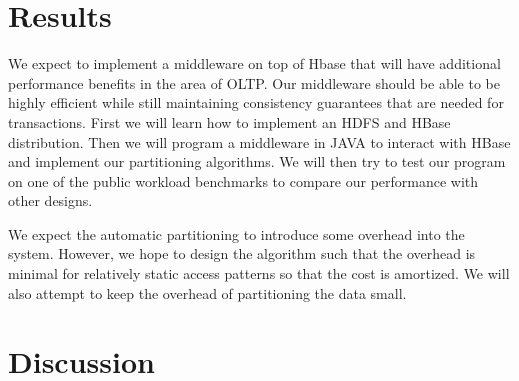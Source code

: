 \documentclass[10pt,final,journal]{IEEEtran}
\begin{document}
\section{Results}
We expect to implement a middleware on top of Hbase that will have additional performance benefits in the area of OLTP.  Our middleware should be able to be highly efficient while still maintaining consistency guarantees that are needed for transactions.  First we will learn how to implement an HDFS and HBase distribution.  Then we will program a middleware in JAVA to interact with HBase and implement our partitioning algorithms.  We will then try to test our program on one of the public workload benchmarks to compare our performance with other designs.

We expect the automatic partitioning to introduce some overhead into the system. However, we hope to design the algorithm such that the overhead is minimal for relatively static access patterns so that the cost is amortized. We will also attempt to keep the overhead of partitioning the data small.

\section{Discussion}




\end{document}
